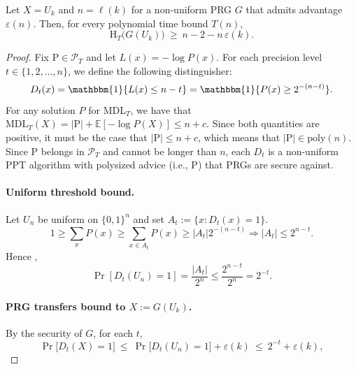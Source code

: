 \documentclass[twoside]{article}
\newcommand{\E}{\mathbb{E}}
\newcommand{\rH}{\mathrm{H}}
\begin{document}
\begin{theorem}
\label{thm:maxent}
Let $X = U_k$ and $n = \ell(k)$ for a non-uniform PRG $G$ that admits advantage $\varepsilon(n)$.
Then, for every polynomial time bound $T(n)$,
\begin{equation}
    \rH_T\bigl(G(U_k)\bigr)\ \ge\ n - 2 - n\,\varepsilon(k).
\end{equation}
\end{theorem}
\begin{proof}
Fix $\mathrm{P}\in \mathcal{P}_T$ and  let $L(x) = -\log P(x)$. For each precision level $t\in \{1, 2, \dots, n\}$, we define the following distinguisher:
$$D_t(x) = \mathbbm{1}\{L(x) \leq n-t\} = \mathbbm{1}\{P(x) \geq 2^{-(n-t)}\}.$$
For any solution $P$ for $\mathrm{MDL}_T$, we have that $\mathrm{MDL}_T(X) = |\mathrm{P}| + \E[-\log P(X)] \leq n + c$. Since both quantities are positive, it must be the case that $|\mathrm{P}| \leq n+c$, which means that $|\mathrm{P}| \in \mathrm{poly}(n)$.
Since $\mathrm{P}$ belongs in $\mathcal{P}_T$ and cannot be longer than $n$, each $D_t$ is a non-uniform PPT algorithm with polysized advice (i.e., $\mathrm{P}$) that PRGs are secure against.

\paragraph{Uniform threshold bound.} Let $U_n$ be uniform on $\{0,1\}^n$ and set $A_t := \{x: D_t(x) = 1\}$.
$$1 \geq \sum_{x} P(x) \geq \sum_{x\in A_t} P(x) \geq |A_t| 2^{-(n-t)} \Rightarrow |A_t| \leq 2^{n-t}.$$
Hence ,$$\Pr[D_t(U_n)=1] = \frac{|A_t|}{2^n} \leq \frac{ 2^{n-t}}{2^n} = 2^{-t}.$$

\paragraph{PRG transfers bound to $X:=G(U_k)$.} By the security of $G$, for each $t$,
$$
\Pr\bigl[D_t(X)=1\bigr]\ \le\ \Pr\bigl[D_t(U_n)=1\bigr]+\varepsilon(k)\ \le\ 2^{-t}+\varepsilon(k),
$$


\end{proof}
\end{document}
